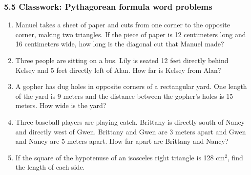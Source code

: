 

\fancyhead[LE]{\thepage}



\subsubsection*{5.5 Classwork: Pythagorean formula word problems}
\begin{enumerate}
\item Manuel takes a sheet of paper and cuts from one corner to the opposite corner, making two triangles. If the piece of paper is 12 centimeters long and 16 centimeters wide, how long is the diagonal cut that Manuel made?
\begin{flushright}
\end{flushright}

    
\item Three people are sitting on a bus. Lily is seated 12 feet directly behind Kelsey and 5 feet directly left of Alan. How far is Kelsey from Alan? \vspace{5cm}

\item A gopher has dug holes in opposite corners of a rectangular yard. One length of the yard is 9 meters and the distance between the gopher's holes is 15 meters. How wide is the yard?

\newpage
\item Three baseball players are playing catch. Brittany is directly south of Nancy and directly west of Gwen. Brittany and Gwen are 3 meters apart and Gwen and Nancy are 5 meters apart. How far apart are Brittany and Nancy? \vspace{4cm}
    
\item If the square of the hypotenuse of an isosceles right triangle is 128 $\text{cm}^2$, find the length of each side.
\begin{flushright}
  \end{flushright} \vspace{2cm}


\end{enumerate}
